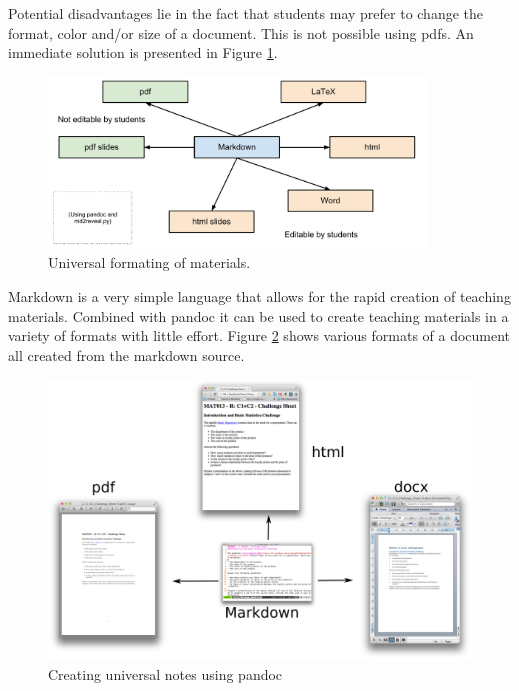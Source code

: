\documentclass[a4paper,12pt]{article}
\begin{document}
Potential disadvantages lie in the fact that students may prefer to change the format, color and/or size of a document. This is not possible using pdfs. An immediate solution is presented in Figure \ref{using_pandoc}.

\begin{figure}[htdp]
    \begin{center}
        \includegraphics[width=10cm]{Images/using_pandoc.pdf}
    \end{center}
    \caption{Universal formating of materials.}
    \label{using_pandoc}
\end{figure}

Markdown is a very simple language that allows for the rapid creation of teaching materials. Combined with pandoc it can be used to create teaching materials in a variety of formats with little effort. Figure \ref{universal_notes} shows various formats of a document all created from the markdown source.\\

\begin{figure}[htdp]
    \begin{center}
        \includegraphics[width=14cm]{images/universal_notes.pdf}
    \end{center}
    \caption{Creating universal notes using pandoc}
    \label{universal_notes}
\end{figure}
\end{document}
